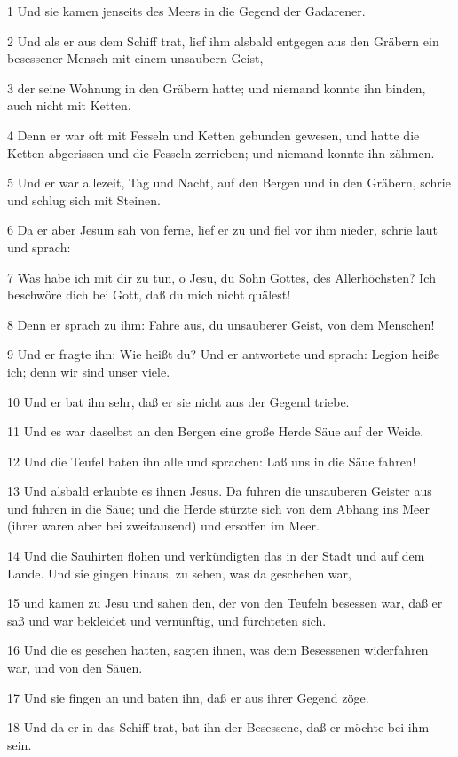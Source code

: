 \par 1 Und sie kamen jenseits des Meers in die Gegend der Gadarener.
\par 2 Und als er aus dem Schiff trat, lief ihm alsbald entgegen aus den Gräbern ein besessener Mensch mit einem unsaubern Geist,
\par 3 der seine Wohnung in den Gräbern hatte; und niemand konnte ihn binden, auch nicht mit Ketten.
\par 4 Denn er war oft mit Fesseln und Ketten gebunden gewesen, und hatte die Ketten abgerissen und die Fesseln zerrieben; und niemand konnte ihn zähmen.
\par 5 Und er war allezeit, Tag und Nacht, auf den Bergen und in den Gräbern, schrie und schlug sich mit Steinen.
\par 6 Da er aber Jesum sah von ferne, lief er zu und fiel vor ihm nieder, schrie laut und sprach:
\par 7 Was habe ich mit dir zu tun, o Jesu, du Sohn Gottes, des Allerhöchsten? Ich beschwöre dich bei Gott, daß du mich nicht quälest!
\par 8 Denn er sprach zu ihm: Fahre aus, du unsauberer Geist, von dem Menschen!
\par 9 Und er fragte ihn: Wie heißt du? Und er antwortete und sprach: Legion heiße ich; denn wir sind unser viele.
\par 10 Und er bat ihn sehr, daß er sie nicht aus der Gegend triebe.
\par 11 Und es war daselbst an den Bergen eine große Herde Säue auf der Weide.
\par 12 Und die Teufel baten ihn alle und sprachen: Laß uns in die Säue fahren!
\par 13 Und alsbald erlaubte es ihnen Jesus. Da fuhren die unsauberen Geister aus und fuhren in die Säue; und die Herde stürzte sich von dem Abhang ins Meer (ihrer waren aber bei zweitausend) und ersoffen im Meer.
\par 14 Und die Sauhirten flohen und verkündigten das in der Stadt und auf dem Lande. Und sie gingen hinaus, zu sehen, was da geschehen war,
\par 15 und kamen zu Jesu und sahen den, der von den Teufeln besessen war, daß er saß und war bekleidet und vernünftig, und fürchteten sich.
\par 16 Und die es gesehen hatten, sagten ihnen, was dem Besessenen widerfahren war, und von den Säuen.
\par 17 Und sie fingen an und baten ihn, daß er aus ihrer Gegend zöge.
\par 18 Und da er in das Schiff trat, bat ihn der Besessene, daß er möchte bei ihm sein.
